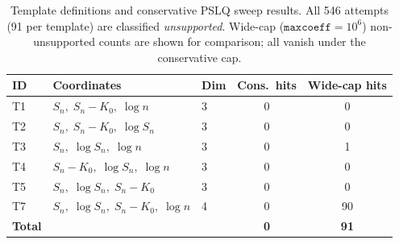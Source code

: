 \begin{table}[h]
\centering
\caption{Template definitions and conservative PSLQ sweep results.
All 546 attempts (91 per template) are classified \emph{unsupported}.
Wide-cap ($\texttt{maxcoeff}=10^6$) non-unsupported counts are shown for
comparison; all vanish under the conservative cap.}
\smallskip
\begin{tabular}{lllcc}
\hline
ID & Coordinates & Dim & Cons.\ hits & Wide-cap hits \\
\hline
T1 & $S_n,\; S_n{-}K_0,\; \log n$ & 3 & 0 & 0 \\
T2 & $S_n,\; S_n{-}K_0,\; \log S_n$ & 3 & 0 & 0 \\
T3 & $S_n,\; \log S_n,\; \log n$ & 3 & 0 & 1 \\
T4 & $S_n{-}K_0,\; \log S_n,\; \log n$ & 3 & 0 & 0 \\
T5 & $S_n,\; \log S_n,\; S_n{-}K_0$ & 3 & 0 & 0 \\
T7 & $S_n,\; \log S_n,\; S_n{-}K_0,\; \log n$ & 4 & 0 & 90 \\
\hline
\textbf{Total} & & & \textbf{0} & \textbf{91} \\
\hline
\end{tabular}
\label{tab:templates}
\end{table}
